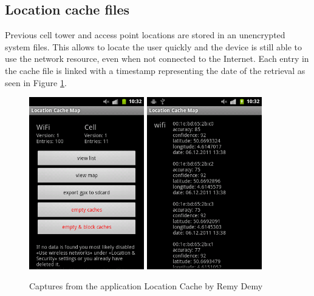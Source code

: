 \subsection{Location cache files}

Previous cell tower and access point locations are stored in an unencrypted system files.
This allows to locate the user quickly and the device is still able to use the network resource, even when not connected to the Internet.
Each entry in the cache file is linked with a timestamp representing the date of the retrieval as seen in Figure \ref{fig:locmap}.\\

\begin{figure}[h]
  \centering
  \includegraphics[width=5cm]{images/cache1.png}
  \includegraphics[width=5cm]{images/cache2.png}
  \caption{Captures from the application Location Cache by Remy Demy}
  \label{fig:locmap}
\end{figure}

